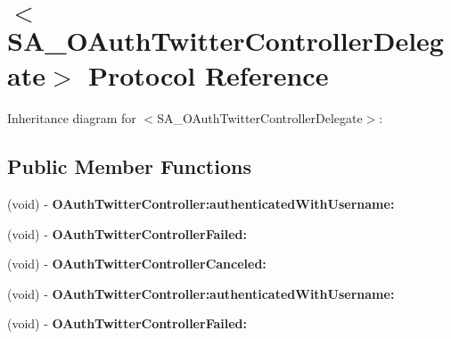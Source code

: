 \hypertarget{protocol_s_a___o_auth_twitter_controller_delegate-p}{
\section{$<$\-S\-A\-\_\-\-O\-Auth\-Twitter\-Controller\-Delegate$>$ \-Protocol \-Reference}
\label{protocol_s_a___o_auth_twitter_controller_delegate-p}
}


\-Inheritance diagram for $<$\-S\-A\-\_\-\-O\-Auth\-Twitter\-Controller\-Delegate$>$\-:
\subsection*{\-Public \-Member \-Functions}
\begin{DoxyCompactItemize}
\item 
\hypertarget{protocol_s_a___o_auth_twitter_controller_delegate-p_a24452feb5fff248715325c8f0dfa264e}{
(void) -\/ {\bfseries \-O\-Auth\-Twitter\-Controller\-:authenticated\-With\-Username\-:}}
\label{protocol_s_a___o_auth_twitter_controller_delegate-p_a24452feb5fff248715325c8f0dfa264e}

\item 
\hypertarget{protocol_s_a___o_auth_twitter_controller_delegate-p_a8c22b3e713d5e3faf151190118e2c745}{
(void) -\/ {\bfseries \-O\-Auth\-Twitter\-Controller\-Failed\-:}}
\label{protocol_s_a___o_auth_twitter_controller_delegate-p_a8c22b3e713d5e3faf151190118e2c745}

\item 
\hypertarget{protocol_s_a___o_auth_twitter_controller_delegate-p_a77fde444a41b9997a495c9fd8b0def58}{
(void) -\/ {\bfseries \-O\-Auth\-Twitter\-Controller\-Canceled\-:}}
\label{protocol_s_a___o_auth_twitter_controller_delegate-p_a77fde444a41b9997a495c9fd8b0def58}

\item 
\hypertarget{protocol_s_a___o_auth_twitter_controller_delegate-p_a24452feb5fff248715325c8f0dfa264e}{
(void) -\/ {\bfseries \-O\-Auth\-Twitter\-Controller\-:authenticated\-With\-Username\-:}}
\label{protocol_s_a___o_auth_twitter_controller_delegate-p_a24452feb5fff248715325c8f0dfa264e}

\item 
\hypertarget{protocol_s_a___o_auth_twitter_controller_delegate-p_a8c22b3e713d5e3faf151190118e2c745}{
(void) -\/ {\bfseries \-O\-Auth\-Twitter\-Controller\-Failed\-:}}
\label{protocol_s_a___o_auth_twitter_controller_delegate-p_a8c22b3e713d5e3faf151190118e2c745}


\end{DoxyCompactItemize}
